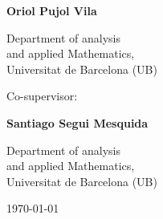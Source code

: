 \begin{titlepage}
\begin{center}
\begin{multicols}{2}
		
		\medskip %
		
		{\Large\bf Oriol Pujol Vila}
		
		\medskip %
		
		{Department of analysis\\
			and applied Mathematics,\\
			 Universitat de Barcelona (UB)}
		
		\medskip
		
		{\large Co-supervisor:}
		
		\medskip
				
		{\Large\bf Santiago Segui Mesquida}
			
		\medskip %

		{Department of analysis\\
			and applied Mathematics,\\
			Universitat de Barcelona (UB)}
		\end{multicols}
		\medskip\medskip\medskip\medskip\medskip
			
		\today
		
	\end{center}

\end{titlepage}